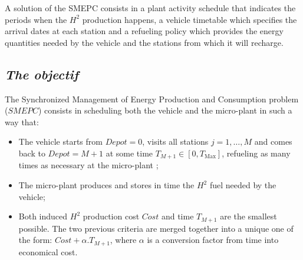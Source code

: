 \documentclass[11pt]{article}
\theoremstyle{plain}%
\theoremstyle{definition} \newtheorem{lem}{Lemma}[section]
\theoremstyle{definition} \newtheorem{claim}{Claim}[lem]
\theoremstyle{definition} \newtheorem{theorem}{Theorem}[section]
\theoremstyle{definition} \newtheorem{exo}{Exercice n$^\circ$}
\theoremstyle{definition} \newtheorem{quest}{}[exo]
\theoremstyle{definition} \newtheorem{sousquest}{}[quest]
\theoremstyle{remark}
\theoremstyle{definition}
\begin{document}
A solution of the SMEPC consists in a plant activity schedule that indicates the periods when the
$H^2$ production happens, a vehicle timetable which specifies the arrival dates at each station
and a refueling policy which provides the energy quantities needed by the vehicle and the stations
from which it will recharge.
\subsection{{\it The objectif}}
The Synchronized Management of Energy Production and Consumption problem ($SMEPC$) consists
in scheduling both the vehicle and the micro-plant in such a way that:
\begin{itemize}
\item The vehicle starts from $Depot = 0$, visits all stations $j = 1,\ldots, M$ and comes back to $Depot=M+1$ at some time $T_{M+1} \in [0, T_{\textrm{Max}}]$, refueling as many times as necessary at the micro-plant ; 
\item The micro-plant produces and stores in time the $H^2$ fuel needed by the vehicle;
\item  Both induced $H^2$ production cost $Cost$ and time $T_{M+1}$ are the smallest possible. The two previous criteria are merged together into a unique one of the form: $Cost + \alpha.T_{M+1}$, where $\alpha$ is a conversion factor from time into  economical cost.
\end{itemize}

\end{document}
